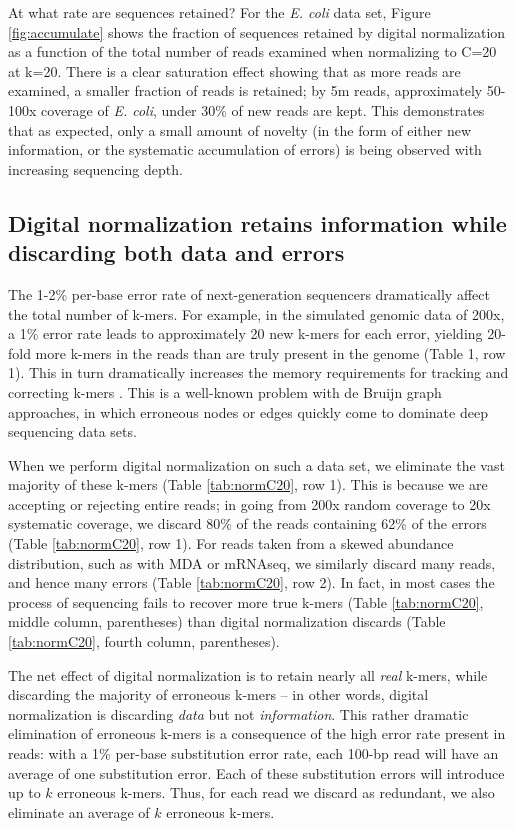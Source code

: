 \documentclass[10pt]{article}
\begin{document}
At what rate are sequences retained?  For the {\em E. coli} data set,
Figure \ref{fig:accumulate} shows the fraction of sequences retained
by digital normalization as a function of the total number of reads
examined when normalizing to C=20 at k=20.  There is a clear
saturation effect showing that as more reads are examined, a smaller
fraction of reads is retained; by 5m reads, approximately 50-100x
coverage of {\em E. coli}, under 30\% of new reads are kept.  This
demonstrates that as expected, only a small amount of novelty (in
the form of either new information, or the systematic accumulation of
errors) is being observed with increasing sequencing depth.

\subsection*{Digital normalization retains information while discarding
both data and errors}

The 1-2\% per-base error rate of next-generation sequencers
dramatically affect the total number of k-mers.  For example, in the
simulated genomic data of 200x, a 1\% error rate leads to
approximately 20 new k-mers for each error, yielding 20-fold more
k-mers in the reads than are truly present in the genome (Table 1, row
1).  This in turn dramatically increases the memory requirements for
tracking and correcting k-mers \cite{pubmed21245053}.  This is a
well-known problem with de Bruijn graph approaches, in which erroneous
nodes or edges quickly come to dominate deep sequencing data sets.

When we perform digital normalization on such a data set, we eliminate
the vast majority of these k-mers (Table \ref{tab:normC20}, row 1).
This is because we are accepting or rejecting entire reads; in
going from 200x random coverage to 20x systematic coverage, we
discard 80\% of the reads containing 62\% of the errors (Table
\ref{tab:normC20}, row 1).  For reads taken from a skewed abundance
distribution, such as with MDA or mRNAseq, we similarly discard many
reads, and hence many errors (Table \ref{tab:normC20}, row 2).  In
fact, in most cases the process of sequencing fails to recover
more true k-mers (Table \ref{tab:normC20}, middle column, parentheses) than
digital
normalization discards (Table \ref{tab:normC20}, fourth column, parentheses).

The net effect of digital normalization is to retain nearly all {\em
  real} k-mers, while discarding the majority of erroneous k-mers --
in other words, digital normalization is discarding {\em data} but not
{\em information}.  This rather dramatic elimination of erroneous
k-mers is a consequence of the high error rate present in reads: with
a 1\% per-base substitution error rate, each 100-bp read will have an
average of one substitution error. Each of these substitution errors
will introduce up to $k$ erroneous k-mers.  Thus, for each read we
discard as redundant, we also eliminate an average of $k$ erroneous
k-mers.
\end{document}
